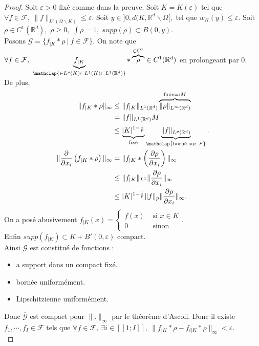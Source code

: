 \begin{proof}
    Soit $\varepsilon >0$ fixé comme dans la preuve. Soit $K=K(\varepsilon )$ tel que $\forall f\in \mathcal{F},\ \|f\|_{L^p(\Omega \backslash K)}\le \varepsilon.$ Soit $y\in ]0,d(K,\mathbb{R} ^d \backslash \Omega[,$ tel que $w_K(y)\le \varepsilon .$ Soit $\rho\in C^1(\mathbb{R} ^d),$ $\rho\ge 0,$ $\int\rho=1,$ $supp(\rho)\subset B(0,y).$ \\
    Posons $\mathcal{G}=\{f_{|K}*\rho\ |\ f\in \mathcal{F}\} .$ On note que $\forall f\in \mathcal{F},\ \underbrace{f_{|K}}_{\mathclap{\in L^p(K)\subset L^1(K)\subset L^1(\mathbb{R} ^d)}}*\overbrace{\rho}^{\in C^1}\in C^1(\mathbb{R} ^d)$ en prolongeant par 0.\\
    De plus,
     \begin{align*}
         \|f_{|K}*\rho\|_\infty &\le \|f_{|K}\|_{L^1(\mathbb{R} ^d)}\overbrace{\|\rho\|_{L^\infty (\mathbb{R} ^d)}}^{\text{finie}=:M}\\
                                &=\|f\|_{L^1(\mathbb{R} ^d)}M\\
                                &\le \underbrace{|K| ^{1-\frac{1}{p}}}_{\text{fixé}}\underbrace{\|f\|_{L^p(\mathbb{R} ^d)}}_{\mathclap{\text{borné sur }\mathcal{F}}}.\\
         \|\frac{\partial }{\partial x_i} \left( f_{|K}*\rho \right) \|_\infty &=\|f_{|K}*\left( \frac{\partial \rho}{\partial x_i}  \right) \|_\infty \\
   &\le \|f_{|K}\|_{L^1}\|\frac{\partial \rho}{\partial x_i} \|_\infty \\
   &\le |K|^{1-\frac{1}{p}}\|f\|_p\|\frac{\partial \rho}{\partial x_i} \|_\infty .
    \end{align*}
    On a posé abusivement $f_{|K}(x)=\left\{\begin{array}{cc}f(x) &\text{ si }x\in K\\0 & \text{ sinon}\end{array}\right.$. \\
    Enfin $supp(f_{|K})\subset K+B'(0,\varepsilon )$ compact.\\
    Ainsi $\mathcal{G}$ est constitué de fonctions :
    \begin{itemize}
        \item a support dans un compact fixé.
        \item bornée uniformément.
        \item Lipschitzienne uniformément.
    \end{itemize}
    Donc $\overline{\mathcal{G}}$ est compact pour $\|.\|_\infty $ par le théorème d'Ascoli. Donc il existe $f_1,\cdots,f_I\in \mathcal{F}$ tels que $\forall f\in \mathcal{F},\ \exists i\in [\![1;I]\!],\ \|f_{|K}*\rho-f_{i|K}*\rho\|_\infty <\varepsilon . $ \\

\end{proof}
